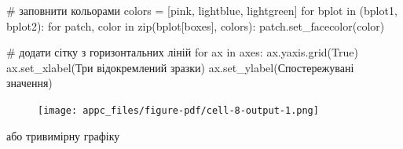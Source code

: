 \documentclass[
  letterpaper,
]{report}
\newenvironment{Shaded}{\begin{snugshade}}{\end{snugshade}}
\newcommand{\BuiltInTok}[1]{\textcolor[rgb]{0.00,0.23,0.31}{#1}}
\newcommand{\CommentTok}[1]{\textcolor[rgb]{0.37,0.37,0.37}{#1}}
\newcommand{\ControlFlowTok}[1]{\textcolor[rgb]{0.00,0.23,0.31}{#1}}
\newcommand{\KeywordTok}[1]{\textcolor[rgb]{0.00,0.23,0.31}{#1}}
\newcommand{\NormalTok}[1]{\textcolor[rgb]{0.00,0.23,0.31}{#1}}
\newcommand{\OperatorTok}[1]{\textcolor[rgb]{0.37,0.37,0.37}{#1}}
\newcommand{\StringTok}[1]{\textcolor[rgb]{0.13,0.47,0.30}{#1}}
\newcommand{\VariableTok}[1]{\textcolor[rgb]{0.07,0.07,0.07}{#1}}
\begin{document}
\begin{Shaded}
\begin{Highlighting}[]
\CommentTok{\# заповнити кольорами}
\NormalTok{colors }\OperatorTok{=}\NormalTok{ [}\StringTok{\textquotesingle{}pink\textquotesingle{}}\NormalTok{, }\StringTok{\textquotesingle{}lightblue\textquotesingle{}}\NormalTok{, }\StringTok{\textquotesingle{}lightgreen\textquotesingle{}}\NormalTok{]}
\ControlFlowTok{for}\NormalTok{ bplot }\KeywordTok{in}\NormalTok{ (bplot1, bplot2):}
    \ControlFlowTok{for}\NormalTok{ patch, color }\KeywordTok{in} \BuiltInTok{zip}\NormalTok{(bplot[}\StringTok{\textquotesingle{}boxes\textquotesingle{}}\NormalTok{], colors):}
\NormalTok{        patch.set\_facecolor(color)}

\CommentTok{\# додати сітку з горизонтальних ліній}
\ControlFlowTok{for}\NormalTok{ ax }\KeywordTok{in}\NormalTok{ axes:}
\NormalTok{    ax.yaxis.grid(}\VariableTok{True}\NormalTok{)}
\NormalTok{    ax.set\_xlabel(}\StringTok{\textquotesingle{}Три відокремлений зразки\textquotesingle{}}\NormalTok{)}
\NormalTok{    ax.set\_ylabel(}\StringTok{\textquotesingle{}Спостережувані значення\textquotesingle{}}\NormalTok{)}
\end{Highlighting}
\end{Shaded}

\begin{figure}[H]

{\centering \texttt{[image: appc\_files/figure-pdf/cell-8-output-1.png]}

}

\end{figure}

або тривимірну графіку
\end{document}

